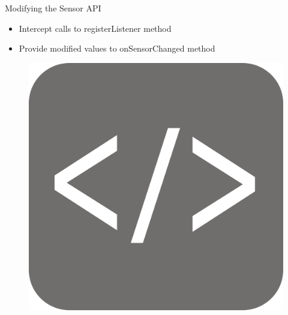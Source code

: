 \documentclass[aspectratio=169]{beamer}
[aspectratio=169] %
\begin{document}
\begin{frame}{Modifying the Sensor API}
  \begin{minipage}{0.49\textwidth} 
    \begin{itemize}
      \item Intercept calls to registerListener method
      \pause
      \item Provide modified values to onSensorChanged method
    \end{itemize}
  \end{minipage}
  \hfill
  \begin{minipage}{0.49\textwidth} 
    \begin{figure}
      \centering
      \includegraphics[height=0.5\textheight]{figures/code.png}
    \end{figure}
  \end{minipage}
\end{frame}
\end{document}
